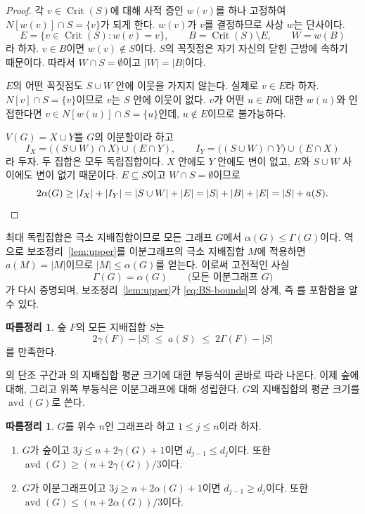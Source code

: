 \documentclass[11pt,a4paper]{article}
\theoremstyle{definition}
\newtheorem{corollary}[theorem]{따름정리}
\newcommand{\Crit}{\operatorname{Crit}}
\begin{document}
\begin{proof}
각 $v\in\Crit(S)$에 대해 사적 증인 $w(v)$를 하나 고정하여 $N[w(v)]\cap S=\{v\}$가
되게 한다. $w(v)$가 $v$를 결정하므로 사상 $w$는 단사이다.
\[
  E=\{v\in\Crit(S): w(v)=v\},\qquad B=\Crit(S)\setminus E,\qquad W=w(B)
\]
라 하자. $v\in B$이면 $w(v)\notin S$이다. $S$의 꼭짓점은 자기 자신의 닫힌 근방에
속하기 때문이다. 따라서 $W\cap S=\emptyset$이고 $|W|=|B|$이다.

$E$의 어떤 꼭짓점도 $S\cup W$ 안에 이웃을 가지지 않는다. 실제로 $v\in E$라 하자.
$N[v]\cap S=\{v\}$이므로 $v$는 $S$ 안에 이웃이 없다. $v$가 어떤 $u\in B$에 대한
$w(u)$와 인접한다면 $v\in N[w(u)]\cap S=\{u\}$인데, $u\notin E$이므로 불가능하다.

$V(G)=X\sqcup Y$를 $G$의 이분할이라 하고
\[
  I_X=\bigl((S\cup W)\cap X\bigr)\cup(E\cap Y),\qquad
  I_Y=\bigl((S\cup W)\cap Y\bigr)\cup(E\cap X)
\]
라 두자. 두 집합은 모두 독립집합이다. $X$ 안에도 $Y$ 안에도 변이 없고, $E$와
$S\cup W$ 사이에도 변이 없기 때문이다. $E\subseteq S$이고 $W\cap S=\emptyset$이므로
\[
  2\alpha(G)\ge|I_X|+|I_Y|=|S\cup W|+|E|=|S|+|B|+|E|=|S|+a(S). \qedhere
\]
\end{proof}

최대 독립집합은 극소 지배집합이므로 모든 그래프 $G$에서 $\alpha(G)\le\Gamma(G)$이다.
역으로 보조정리~\ref{lem:upper}를 이분그래프의 극소 지배집합 $M$에 적용하면
$a(M)=|M|$이므로 $|M|\le\alpha(G)$를 얻는다. 이로써 고전적인 사실~\cite{CFPT}
\begin{equation}\label{eq:alpha-Gamma}
  \Gamma(G)=\alpha(G)\qquad\text{(모든 이분그래프 $G$)}
\end{equation}
가 다시 증명되며, 보조정리~\ref{lem:upper}가 \eqref{eq:BS-bounds}의 상계, 즉
\cite[Lemma~15]{BS}를 포함함을 알 수 있다.

\begin{corollary}\label{cor:twosided}
숲 $F$의 모든 지배집합 $S$는
\begin{equation}\label{eq:twosided}
  2\gamma(F)-|S|\;\le\;a(S)\;\le\;2\Gamma(F)-|S|
\end{equation}
를 만족한다.
\end{corollary}

\cite[Theorems~6, 16]{BS}의 단조 구간과 \cite[Theorem~18]{BS}의 지배집합 평균 크기에
대한 부등식이 곧바로 따라 나온다. 이제 숲에 대해, 그리고 위쪽 부등식은 이분그래프에
대해 성립한다. $G$의 지배집합의 평균 크기를 $\operatorname{avd}(G)$로 쓴다.

\begin{corollary}\label{cor:segments}
$G$를 위수 $n$인 그래프라 하고 $1\le j\le n$이라 하자.
\begin{enumerate}
\item[\textup{(i)}] $G$가 숲이고 $3j\le n+2\gamma(G)+1$이면 $d_{j-1}\le d_j$이다. 또한
$\operatorname{avd}(G)\ge(n+2\gamma(G))/3$이다.
\item[\textup{(ii)}] $G$가 이분그래프이고 $3j\ge n+2\alpha(G)+1$이면
$d_{j-1}\ge d_j$이다. 또한 $\operatorname{avd}(G)\le(n+2\alpha(G))/3$이다.
\end{enumerate}
\end{corollary}
\end{document}

